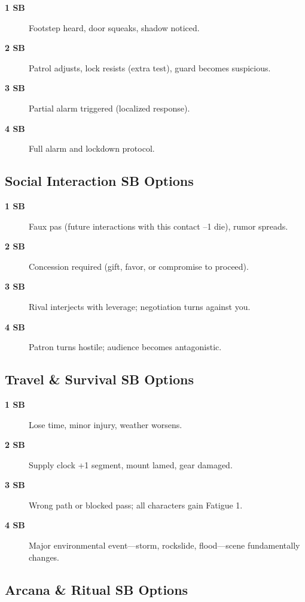 \begin{description}
\item[\textbf{1 SB}] Footstep heard, door squeaks, shadow noticed.
\item[\textbf{2 SB}] Patrol adjusts, lock resists (extra test), guard becomes suspicious.
\item[\textbf{3 SB}] Partial alarm triggered (localized response).
\item[\textbf{4 SB}] Full alarm and lockdown protocol.
\end{description}

\subsection{Social Interaction SB Options}
\label{subsec:social-sb}

\begin{description}
\item[\textbf{1 SB}] Faux pas (future interactions with this contact –1 die), rumor spreads.
\item[\textbf{2 SB}] Concession required (gift, favor, or compromise to proceed).
\item[\textbf{3 SB}] Rival interjects with leverage; negotiation turns against you.
\item[\textbf{4 SB}] Patron turns hostile; audience becomes antagonistic.
\end{description}

\subsection{Travel \& Survival SB Options}
\label{subsec:travel-sb}

\begin{description}
\item[\textbf{1 SB}] Lose time, minor injury, weather worsens.
\item[\textbf{2 SB}] Supply clock +1 segment, mount lamed, gear damaged.
\item[\textbf{3 SB}] Wrong path or blocked pass; all characters gain Fatigue 1.
\item[\textbf{4 SB}] Major environmental event—storm, rockslide, flood—scene fundamentally changes.
\end{description}

\subsection{Arcana \& Ritual SB Options}
\label{subsec:arcana-sb}

